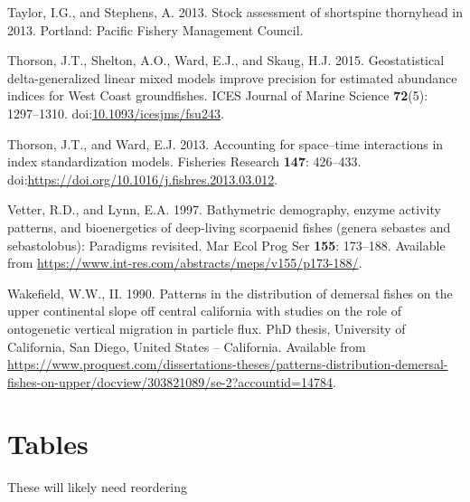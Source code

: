 \documentclass[11pt,
  english,
  letterpaper,
]{article}
\newlength{\cslhangindent}
\newenvironment{CSLReferences}[2] %
 {%
  \setlength{\parindent}{0pt}
  \ifodd #1 \everypar{\setlength{\hangindent}{\cslhangindent}}\ignorespaces\fi
  \ifnum #2 > 0
  \setlength{\parskip}{#2\baselineskip}
  \fi
 }%
 {}
\begin{document}
\begin{CSLReferences}{1}{0}
\leavevmode{}%
Taylor, I.G., and Stephens, A. 2013. Stock assessment of shortspine thornyhead in 2013. Portland: Pacific Fishery Management Council.

\leavevmode{}%
Thorson, J.T., Shelton, A.O., Ward, E.J., and Skaug, H.J. 2015. {Geostatistical delta-generalized linear mixed models improve precision for estimated abundance indices for West Coast groundfishes}. ICES Journal of Marine Science \textbf{72}(5): 1297--1310. doi:\href{https://doi.org/10.1093/icesjms/fsu243}{10.1093/icesjms/fsu243}.

\leavevmode{}%
Thorson, J.T., and Ward, E.J. 2013. Accounting for space--time interactions in index standardization models. Fisheries Research \textbf{147}: 426--433. doi:\url{https://doi.org/10.1016/j.fishres.2013.03.012}.

\leavevmode{}%
Vetter, R.D., and Lynn, E.A. 1997. Bathymetric demography, enzyme activity patterns, and bioenergetics of deep-living scorpaenid fishes (genera sebastes and sebastolobus): Paradigms revisited. Mar Ecol Prog Ser \textbf{155}: 173--188. Available from \url{https://www.int-res.com/abstracts/meps/v155/p173-188/}.

\leavevmode{}%
Wakefield, W.W., II. 1990. Patterns in the distribution of demersal fishes on the upper continental slope off central california with studies on the role of ontogenetic vertical migration in particle flux. PhD thesis, University of California, San Diego, United States -- California. Available from \url{https://www.proquest.com/dissertations-theses/patterns-distribution-demersal-fishes-on-upper/docview/303821089/se-2?accountid=14784}.

\end{CSLReferences}

\clearpage

\hypertarget{tables}{%
\section{Tables}\label{tables}}

These will likely need reordering \begingroup\fontsize{10}{12}\selectfont \begingroup\fontsize{10}{12}\selectfont
\end{document}
